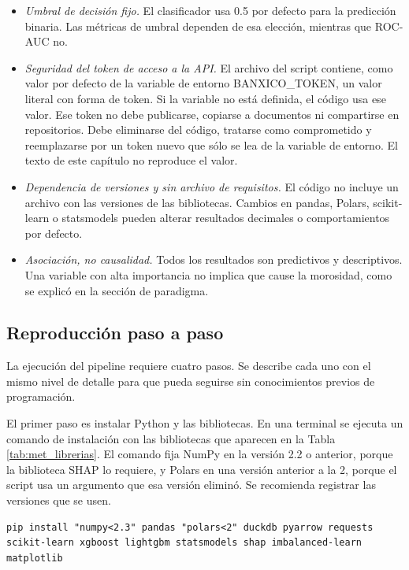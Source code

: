 \begin{itemize}
    \item \textit{Umbral de decisión fijo.} El clasificador usa 0.5 por defecto para la predicción binaria. Las métricas de umbral dependen de esa elección, mientras que ROC-AUC no.

    \item \textit{Seguridad del token de acceso a la API.} El archivo del script contiene, como valor por defecto de la variable de entorno BANXICO\_TOKEN, un valor literal con forma de token. Si la variable no está definida, el código usa ese valor. Ese token no debe publicarse, copiarse a documentos ni compartirse en repositorios. Debe eliminarse del código, tratarse como comprometido y reemplazarse por un token nuevo que sólo se lea de la variable de entorno. El texto de este capítulo no reproduce el valor.

    \item \textit{Dependencia de versiones y sin archivo de requisitos.} El código no incluye un archivo con las versiones de las bibliotecas. Cambios en pandas, Polars, scikit-learn o statsmodels pueden alterar resultados decimales o comportamientos por defecto. %

    \item \textit{Asociación, no causalidad.} Todos los resultados son predictivos y descriptivos. Una variable con alta importancia no implica que cause la morosidad, como se explicó en la sección de paradigma.
\end{itemize}

\subsection{Reproducción paso a paso}
La ejecución del pipeline requiere cuatro pasos. Se describe cada uno con el mismo nivel de detalle para que pueda seguirse sin conocimientos previos de programación.

El primer paso es instalar Python y las bibliotecas. En una terminal se ejecuta un comando de instalación con las bibliotecas que aparecen en la Tabla \ref{tab:met_librerias}. El comando fija NumPy en la versión 2.2 o anterior, porque la biblioteca SHAP lo requiere, y Polars en una versión anterior a la 2, porque el script usa un argumento que esa versión eliminó. Se recomienda registrar las versiones que se usen.

\begin{lstlisting}[caption={Instalación de dependencias del pipeline}, label={lst:met_instalacion}]
pip install "numpy<2.3" pandas "polars<2" duckdb pyarrow requests scikit-learn xgboost lightgbm statsmodels shap imbalanced-learn matplotlib
\end{lstlisting}

